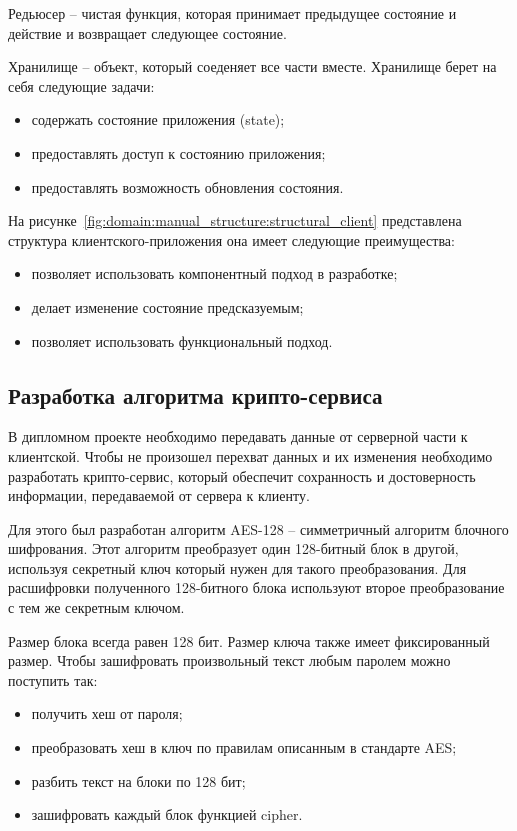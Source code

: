 Редьюсер -- чистая функция, которая принимает предыдущее состояние и действие и возвращает следующее состояние.

Хранилище -- объект, который соеденяет все части вместе. Хранилище берет на себя следующие задачи:
\begin{itemize}
  \item содержать состояние приложения (state);
  \item предоставлять доступ к состоянию приложения;
  \item предоставлять возможность обновления состояния.
\end{itemize}

На рисунке~\ref{fig:domain:manual_structure:structural_client} представлена структура клиентского-приложения она имеет следующие преимущества:
\begin{itemize}
  \item позволяет использовать компонентный подход в разработке;
  \item делает изменение состояние предсказуемым;
  \item позволяет использовать функциональный подход.
\end{itemize}

\subsection{Разработка алгоритма крипто-сервиса }
\label{sub:arch_and_mod:alholib-crypto}

В дипломном проекте необходимо передавать данные от серверной части к клиентской. Чтобы не произошел перехват данных и их изменения необходимо разработать крипто-сервис, который обеспечит сохранность и достоверность информации, передаваемой от сервера к клиенту.

Для этого был разработан алгоритм AES-128 -- симметричный алгоритм блочного шифрования. Этот алгоритм преобразует один 128-битный блок в другой, используя секретный ключ который нужен для такого преобразования. Для расшифровки полученного 128-битного блока используют второе преобразование с тем же секретным ключом.

Размер блока всегда равен 128 бит. Размер ключа также имеет фиксированный размер. Чтобы зашифровать произвольный текст любым паролем можно поступить так: 

\begin{itemize}
  \item получить хеш от пароля;
  \item преобразовать хеш в ключ по правилам описанным в стандарте AES;
  \item разбить текст на блоки по 128 бит;
  \item зашифровать каждый блок функцией cipher.
\end{itemize}

